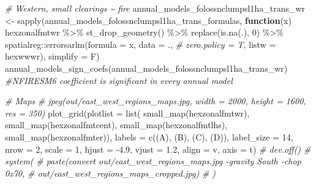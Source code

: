 \documentclass[10pt,landscape,a3paper]{article}
\newenvironment{Shaded}{\begin{snugshade}}{\end{snugshade}}
\newcommand{\AttributeTok}[1]{\textcolor[rgb]{0.77,0.63,0.00}{#1}}
\newcommand{\CommentTok}[1]{\textcolor[rgb]{0.56,0.35,0.01}{\textit{#1}}}
\newcommand{\ControlFlowTok}[1]{\textcolor[rgb]{0.13,0.29,0.53}{\textbf{#1}}}
\newcommand{\DecValTok}[1]{\textcolor[rgb]{0.00,0.00,0.81}{#1}}
\newcommand{\FloatTok}[1]{\textcolor[rgb]{0.00,0.00,0.81}{#1}}
\newcommand{\FunctionTok}[1]{\textcolor[rgb]{0.00,0.00,0.00}{#1}}
\newcommand{\NormalTok}[1]{#1}
\newcommand{\OtherTok}[1]{\textcolor[rgb]{0.56,0.35,0.01}{#1}}
\newcommand{\SpecialCharTok}[1]{\textcolor[rgb]{0.00,0.00,0.00}{#1}}
\newcommand{\StringTok}[1]{\textcolor[rgb]{0.31,0.60,0.02}{#1}}
\begin{document}
\begin{Shaded}
\begin{Highlighting}[]
\CommentTok{\# Western, small clearings \textasciitilde{} fire}
\NormalTok{annual\_models\_folossnclumpsl1ha\_trans\_wr }\OtherTok{\textless{}{-}} \FunctionTok{sapply}\NormalTok{(annual\_models\_folossnclumpsl1ha\_trans\_formulas,}
                        \ControlFlowTok{function}\NormalTok{(x)}
\NormalTok{                          hexzonalfmtwr }\SpecialCharTok{\%\textgreater{}\%}
                          \FunctionTok{st\_drop\_geometry}\NormalTok{() }\SpecialCharTok{\%\textgreater{}\%}
                          \FunctionTok{replace}\NormalTok{(}\FunctionTok{is.na}\NormalTok{(.), }\DecValTok{0}\NormalTok{) }\SpecialCharTok{\%\textgreater{}\%}
\NormalTok{                          spatialreg}\SpecialCharTok{::}\FunctionTok{errorsarlm}\NormalTok{(}\AttributeTok{formula =}\NormalTok{ x,}
                                                 \AttributeTok{data =}\NormalTok{ ., }\CommentTok{\# zero.policy = T,}
                                                 \AttributeTok{listw =}\NormalTok{ hexwwwr),}
                        \AttributeTok{simplify =}\NormalTok{ F)}
\FunctionTok{annual\_models\_sign\_coefs}\NormalTok{(annual\_models\_folossnclumpsl1ha\_trans\_wr) }\CommentTok{\#NFIRESM6 coefficient is significant in every annual model}

\CommentTok{\# Maps}
\CommentTok{\# jpeg(\textquotesingle{}out/east\_west\_regions\_maps.jpg\textquotesingle{}, width = 2000, height = 1600, res = 350)}
\FunctionTok{plot\_grid}\NormalTok{(}\AttributeTok{plotlist =} \FunctionTok{list}\NormalTok{(}
  \FunctionTok{small\_map}\NormalTok{(hexzonalfmtwr),}
  \FunctionTok{small\_map}\NormalTok{(hexzonalfmtcent),}
  \FunctionTok{small\_map}\NormalTok{(hexzonalfmtlhs),}
  \FunctionTok{small\_map}\NormalTok{(hexzonalfmter)),}
  \AttributeTok{labels =} \FunctionTok{c}\NormalTok{(}\StringTok{\textquotesingle{}(A)\textquotesingle{}}\NormalTok{, }\StringTok{\textquotesingle{}(B)\textquotesingle{}}\NormalTok{, }\StringTok{\textquotesingle{}(C)\textquotesingle{}}\NormalTok{, }\StringTok{\textquotesingle{}(D)\textquotesingle{}}\NormalTok{),}
  \AttributeTok{label\_size =} \DecValTok{14}\NormalTok{, }\AttributeTok{nrow =} \DecValTok{2}\NormalTok{, }\AttributeTok{scale =} \DecValTok{1}\NormalTok{, }\AttributeTok{hjust =} \SpecialCharTok{{-}}\FloatTok{4.9}\NormalTok{, }\AttributeTok{vjust =} \FloatTok{1.2}\NormalTok{,}
  \AttributeTok{align =} \StringTok{\textquotesingle{}v\textquotesingle{}}\NormalTok{, }\AttributeTok{axis =} \StringTok{\textquotesingle{}t\textquotesingle{}}\NormalTok{)}
\CommentTok{\# dev.off()}
\CommentTok{\# system(}
\CommentTok{\#   paste(\textquotesingle{}convert out/east\_west\_regions\_maps.jpg {-}gravity South {-}chop 0x70\textquotesingle{},}
\CommentTok{\#          \textquotesingle{}out/east\_west\_regions\_maps\_cropped.jpg\textquotesingle{})}
\CommentTok{\# )}
\end{Highlighting}
\end{Shaded}
\end{document}
